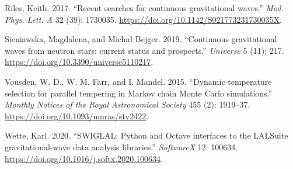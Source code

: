 \documentclass[10pt,a4paper,onecolumn]{article}
\begin{document}
\leavevmode\hypertarget{ref-Riles:2017evm}{}%
Riles, Keith. 2017. ``Recent searches for continuous gravitational
waves.'' \emph{Mod. Phys. Lett. A} 32 (39): 1730035.
\url{https://doi.org/10.1142/S021773231730035X}.

\leavevmode\hypertarget{ref-Sieniawska:2019hmd}{}%
Sieniawska, Magdalena, and Michał Bejger. 2019. ``Continuous
gravitational waves from neutron stars: current status and prospects.''
\emph{Universe} 5 (11): 217.
\url{https://doi.org/10.3390/universe5110217}.

\leavevmode\hypertarget{ref-Vousden:2015pte}{}%
Vousden, W. D., W. M. Farr, and I. Mandel. 2015. ``Dynamic temperature
selection for parallel tempering in Markov chain Monte Carlo
simulations.'' \emph{Monthly Notices of the Royal Astronomical Society}
455 (2): 1919--37. \url{https://doi.org/10.1093/mnras/stv2422}.

\leavevmode\hypertarget{ref-Wette:2020air}{}%
Wette, Karl. 2020. ``SWIGLAL: Python and Octave interfaces to the
LALSuite gravitational-wave data analysis libraries.'' \emph{SoftwareX}
12: 100634. \url{https://doi.org/10.1016/j.softx.2020.100634}.

\end{document}
